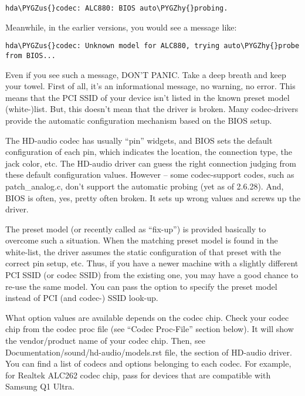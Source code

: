 \documentclass[a4paper,8pt,english]{sphinxmanual}
\def\PYGZus{\char`\_}
\def\PYGZhy{\char`\-}
\begin{document}
\begin{Verbatim}[commandchars=\\\{\}]
hda\PYGZus{}codec: ALC880: BIOS auto\PYGZhy{}probing.
\end{Verbatim}

Meanwhile, in the earlier versions, you would see a message like:

\begin{Verbatim}[commandchars=\\\{\}]
hda\PYGZus{}codec: Unknown model for ALC880, trying auto\PYGZhy{}probe from BIOS...
\end{Verbatim}

Even if you see such a message, DON'T PANIC.  Take a deep breath and
keep your towel.  First of all, it's an informational message, no
warning, no error.  This means that the PCI SSID of your device isn't
listed in the known preset model (white-)list.  But, this doesn't mean
that the driver is broken.  Many codec-drivers provide the automatic
configuration mechanism based on the BIOS setup.

The HD-audio codec has usually ``pin'' widgets, and BIOS sets the default
configuration of each pin, which indicates the location, the
connection type, the jack color, etc.  The HD-audio driver can guess
the right connection judging from these default configuration values.
However -- some codec-support codes, such as patch\_analog.c, don't
support the automatic probing (yet as of 2.6.28).  And, BIOS is often,
yes, pretty often broken.  It sets up wrong values and screws up the
driver.

The preset model (or recently called as ``fix-up'') is provided
basically to overcome such a situation.  When the matching preset
model is found in the white-list, the driver assumes the static
configuration of that preset with the correct pin setup, etc.
Thus, if you have a newer machine with a slightly different PCI SSID
(or codec SSID) from the existing one, you may have a good chance to
re-use the same model.  You can pass the  option to specify the
preset model instead of PCI (and codec-) SSID look-up.

What  option values are available depends on the codec chip.
Check your codec chip from the codec proc file (see ``Codec Proc-File''
section below).  It will show the vendor/product name of your codec
chip.  Then, see Documentation/sound/hd-audio/models.rst file,
the section of HD-audio driver.  You can find a list of codecs
and  options belonging to each codec.  For example, for Realtek
ALC262 codec chip, pass  for devices that are compatible
with Samsung Q1 Ultra.
\end{document}
